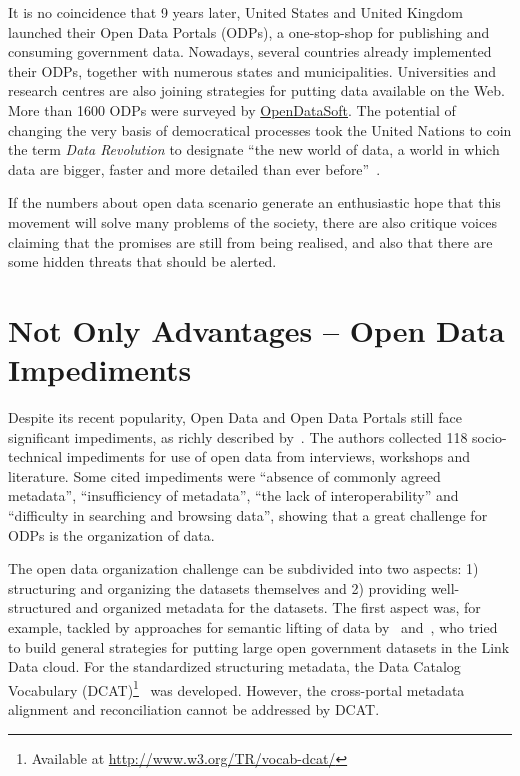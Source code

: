 It is no coincidence that 9 years later, United States and United Kingdom launched their Open Data Portals (ODPs), a one-stop-shop for publishing and consuming government data.
Nowadays, several countries already implemented their ODPs, together with numerous states and municipalities.
Universities and research centres are also joining strategies for putting data available on the Web.
More than 1600 ODPs were surveyed by \href{https://www.opendatasoft.com}{OpenDataSoft}.
The potential of changing the very basis of democratical processes took the United Nations to coin the term \emph{Data Revolution} to designate ``the new world of data, a world in which data are bigger, faster and more detailed than ever before''~\cite{DataRevolutionGroup2014}.

If the numbers about open data scenario generate an enthusiastic hope that this movement will solve many problems of the society, there are also critique voices claiming that the promises are still from being realised, and also that there are some hidden threats that should be alerted.

\section{Not Only Advantages -- Open Data Impediments}

Despite its recent popularity, Open Data and Open Data Portals still face significant impediments, as richly described by~.
The authors collected 118 socio-technical impediments for use of open data from interviews, workshops and literature.
Some cited impediments were ``absence of commonly agreed metadata'', ``insufficiency of metadata'', ``the lack of interoperability'' and ``difficulty in searching and browsing data'', showing that a great challenge for ODPs is the organization of data.

The open data organization challenge can be subdivided into two aspects: 1) structuring and organizing the datasets themselves and 2) providing well-structured and organized metadata for the datasets.
The first aspect was, for example, tackled by approaches for semantic lifting of data by~ and~, who tried to build general strategies for putting large open government datasets in the Link Data cloud.
For the standardized structuring metadata, the Data Catalog Vocabulary (DCAT)\footnote{Available at \url{http://www.w3.org/TR/vocab-dcat/}}~\cite{conf/i-semantics/CyganiakMP10} was developed.
However, the cross-portal metadata alignment and reconciliation cannot be addressed by DCAT.

